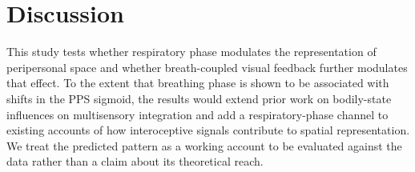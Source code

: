 
\section{Discussion}
This study tests whether respiratory phase modulates the representation of peripersonal space and whether breath-coupled visual feedback further modulates that effect. To the extent that breathing phase is shown to be associated with shifts in the PPS sigmoid, the results would extend prior work on bodily-state influences on multisensory integration and add a respiratory-phase channel to existing accounts of how interoceptive signals contribute to spatial representation. We treat the predicted pattern as a working account to be evaluated against the data rather than a claim about its theoretical reach.
